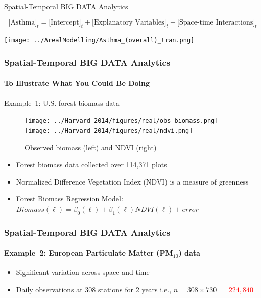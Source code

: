 \documentclass[
10pt]{beamer}
\newcommand{\myitem}{\vskip3mm \item}
\begin{document}
 \begin{frame}{Spatial-Temporal BIG DATA Analytics}

 {\tiny
\[
 \mbox{[Asthma]}_t = \mbox{[Intercept]}_t + \mbox{[Explanatory Variables]}_t + \mbox{[Space-time Interactions]}_t
\]
}

\begin{center}
\texttt{[image: ../ArealModelling/Asthma\_(overall)\_tran.png]}
\end{center}

\end{frame}
 

\begin{frame}
\frametitle{Spatial-Temporal BIG DATA Analytics}
\framesubtitle{To Illustrate What You Could Be Doing}{Example~1: U.S. forest biomass data}
\begin{figure}[]
\begin{center}
\vskip-4mm{\texttt{[image: ../Harvard\_2014/figures/real/obs-biomass.png]}\label{bio-obs}}
{\texttt{[image: ../Harvard\_2014/figures/real/ndvi.png]}\label{bio-ndvi}}
\end{center}
\caption{Observed biomass (left) and NDVI (right)}\label{fig:bio}
\end{figure}
\vspace{-0.5cm}\begin{itemize}
\item Forest biomass data collected over 114,371 plots
\item Normalized Difference Vegetation Index (NDVI) is a measure of greenness
\item {\small Forest Biomass Regression Model: $Biomass(\ell) = \beta_0(\ell) + \beta_1(\ell) NDVI(\ell) + error$}
\end{itemize}

\end{frame}


\begin{frame}
\frametitle{Spatial-Temporal BIG DATA Analytics}
\framesubtitle{Example~2: European Particulate Matter (PM$_{10}$) data}
\begin{figure}[]
\begin{center}
\vskip-8mm{}
\end{center}
\end{figure}
\vspace{-0.5cm}
\begin{itemize}
\myitem Significant variation across space and time
\myitem Daily observations at $308$ stations for 2 years i.e., $n=308\times 730=$ \textcolor{red}{$224,840$}
\end{itemize}
\end{frame}
\end{document}
